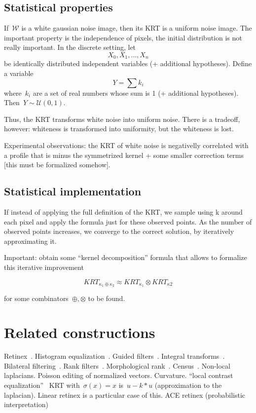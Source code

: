 \documentclass[12pt]{article}                  %
\begin{document}
\subsection{Statistical properties}

If~$\mathcal{W}$ is a white gaussian noise image, then its KRT is a uniform
noise image.  The important property is the independence of pixels, the
initial distribution is not really important.  In the discrete setting, let
\[
	X_0,X_1,\ldots,X_n
\]
be identically distributed independent variables (+ additional hypotheses).
Define a variable
\[
	Y = \sum k_i 
\]
where~$k_i$ are a set of real numbers whose sum is 1 (+ additional
hypotheses).  Then~$Y\sim\mathcal{U}(0,1)$.

Thus, the KRT transforms white noise into uniform noise.  There is a
tradeoff, however: whiteness is transformed into uniformity, but the
whiteness is lost.

Experimental observations: the KRT of white noise is negativelly correlated
with a profile that is minus the symmetrized kernel + some smaller
correction terms [this must be formalized somehow].


\subsection{Statistical implementation}

If instead of applying the full definition of the KRT, we sample using k
around each pixel and apply the formula just for these observed points.  As
the number of observed points increases, we converge to the correct
solution, by iteratively approximating it.

Important: obtain some ``kernel decomposition'' formula that allows to
formalize this iterative improvement

\[
	KRT_{\kappa_1\oplus\kappa_2}\approx KRT_{\kappa_1} \otimes KRT_{\kappa2}
\]

for some combinators~$\oplus,\otimes$ to be found.

\section{Related constructions}

Retinex~\cite{land1971lightness,land1977retinex,land1985recent,kimmel2003variational,provenzi2005mathematical,morel2010pde,petro2014multiscale}.
Histogram equalization~\cite{pizer1987adaptive,abdullah2007dynamic}.
Guided filters~\cite{he2012guided}.
Integral transforms~\cite{bradley2007adaptive}.
Bilateral filtering~\cite{tomasi1998bilateral,durand2002fast,paris2009bilateral}.
Rank filters~\cite{rankfilters1985}.
Morphological rank~\cite{soille2002morphological}.
Census~\cite{ZW,stein2004efficient,whycensus2013}.
Non-local laplacians.
Poisson editing of normalized vectors.
Curvature.
``local contrast equalization''~\cite{sapiro1997histogram}
KRT with~$\sigma(x)=x$ is~$u-k*u$ (approximation to the laplacian).  Linear
retinex is a particular case of this.
ACE retinex (probabilistic interpretation)
\end{document}

